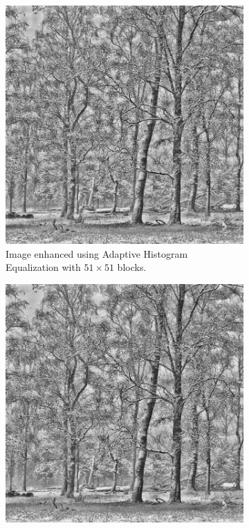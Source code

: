 \documentclass[a4paper, landscape]{article}
\begin{document}
\begin{figure}
    \centering
    \begin{subfigure}{0.32\linewidth}
        \centering
        \includegraphics[height=0.4\textheight, keepaspectratio]{big_enhanced_LC2.png}
        \caption{Image enhanced using Adaptive Histogram Equalization with $51\times 51$ blocks.}
    \end{subfigure}
    \begin{subfigure}{0.32\linewidth}
        \centering
        \includegraphics[height=0.4\textheight, keepaspectratio]{chonky_enhanced_LC2.png}

\end{subfigure}
\end{figure}
\end{document}
